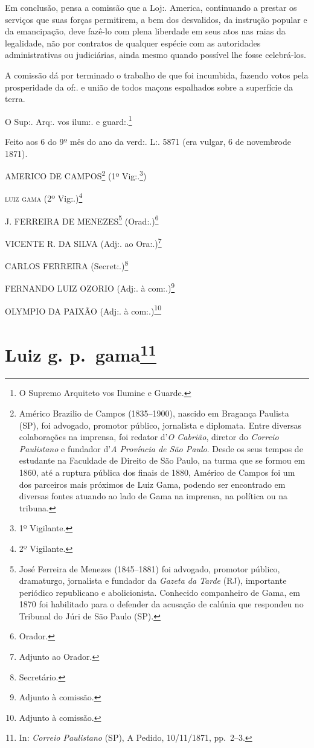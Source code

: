 {Em conclusão, pensa a comissão que a Loj:. America, continuando a
prestar os serviços que suas forças permitirem, a bem dos desvalidos, da
instrução popular e da emancipação, deve fazê-lo com plena liberdade em
seus atos nas raias da legalidade, não por contratos de qualquer espécie
com as autoridades administrativas ou judiciárias, ainda mesmo quando
possível lhe fosse celebrá-los.

A comissão dá por terminado o trabalho de que foi incumbida, fazendo
votos pela prosperidade da of:. e união de todos maçons espalhados sobre
a superfície da terra.

O Sup:. Arq:. vos ilum:. e guard:.\footnote{ O Supremo Arquiteto vos
  Ilumine e Guarde.}

Feito aos 6 do 9º mês do ano da verd:. L:. 5871 (era vulgar, 6 de
novembrode 1871).

AMERICO DE CAMPOS\footnote{ Américo Brazilio de Campos (1835--1900),
  nascido em Bragança Paulista (SP), foi advogado, promotor público,
  jornalista e diplomata. Entre diversas colaborações na imprensa, foi
  redator d'\emph{O Cabrião}, diretor do \emph{Correio Paulistano} e
  fundador d'\emph{A Província de São Paulo}. Desde os seus tempos de
  estudante na Faculdade de Direito de São Paulo, na turma que se formou
  em 1860, até a ruptura pública dos finais de 1880, Américo de Campos
  foi um dos parceiros mais próximos de Luiz Gama, podendo ser
  encontrado em diversas fontes atuando ao lado de Gama na imprensa, na
  política ou na tribuna.} (1º Vig:.\footnote{ 1º Vigilante.})

\textsc{luiz gama} (2º Vig:.)\footnote{ 2º Vigilante.}

J. FERREIRA DE MENEZES\footnote{ José Ferreira de Menezes (1845--1881)
  foi advogado, promotor público, dramaturgo, jornalista e fundador da
  \emph{Gazeta da Tarde} (RJ), importante periódico republicano e
  abolicionista. Conhecido companheiro de Gama, em 1870 foi habilitado
  para o defender da acusação de calúnia que respondeu no Tribunal do
  Júri de São Paulo (SP).} (Orad:.)\footnote{ Orador.}

VICENTE R. DA SILVA (Adj:. ao Ora:.)\footnote{ Adjunto ao Orador.}

CARLOS FERREIRA (Secret:.)\footnote{ Secretário.}

FERNANDO LUIZ OZORIO (Adj:. à com:.)\footnote{ Adjunto à comissão.}

OLYMPIO DA PAIXÃO (Adj:. à com:.)\footnote{ Adjunto à comissão.}

\chapter{Luiz g. p.~gama\footnote{ In: \emph{Correio Paulistano} (SP), A Pedido, 10/11/1871,
  pp.~2--3.}} %

}
